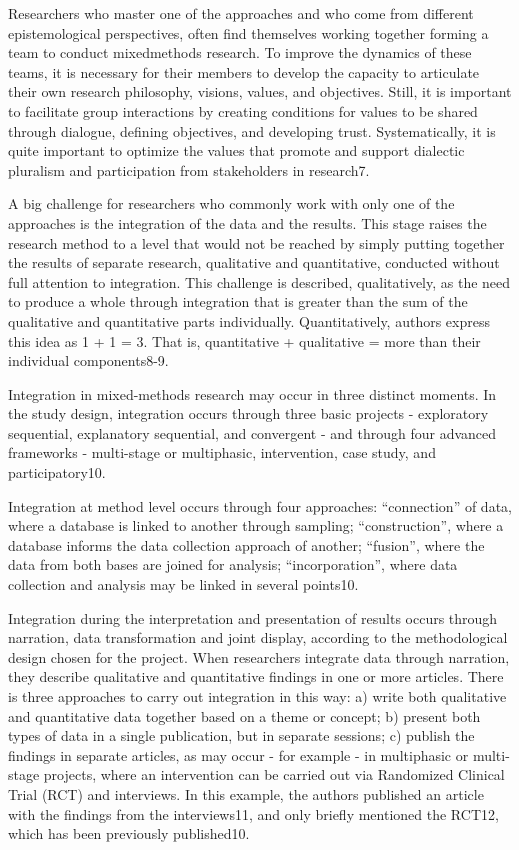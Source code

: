 Researchers who master one of the approaches and who come from different epistemological perspectives, often find themselves working together forming a team to conduct mixedmethods research. To improve the dynamics of these teams, it is necessary for their members to develop the capacity to articulate their own research philosophy, visions, values, and objectives. Still, it is important to facilitate group interactions by creating conditions for values to be shared through dialogue, defining objectives, and developing trust. Systematically, it is quite important to optimize the values that promote and support dialectic pluralism and participation from stakeholders in research7.

A big challenge for researchers who commonly work with only one of the approaches is the integration of the data and the results. This stage raises the research method to a level that would not be reached by simply putting together the results of separate research, qualitative and quantitative, conducted without full attention to integration. This challenge is described, qualitatively, as the need to produce a whole through integration that is greater than the sum of the qualitative and quantitative parts individually. Quantitatively, authors express this idea as 1 + 1 = 3. That is, quantitative + qualitative = more than their individual components8-9.

Integration in mixed-methods research may occur in three distinct moments. In the study design, integration occurs through three basic projects - exploratory sequential, explanatory sequential, and convergent - and through four advanced frameworks - multi-stage or multiphasic, intervention, case study, and participatory10.

Integration at method level occurs through four approaches: “connection” of data, where a database is linked to another through sampling; “construction”, where a database informs the data collection approach of another; “fusion”, where the data from both bases are joined for analysis; “incorporation”, where data collection and analysis may be linked in several points10.

Integration during the interpretation and presentation of results occurs through narration, data transformation and joint display, according  to the methodological design chosen for the project. When researchers integrate data through narration, they describe qualitative and quantitative findings in one or more articles. There is three approaches to carry out integration in this way: a) write both qualitative and quantitative data together based on a theme or concept; b) present both types of data in a single publication, but in separate sessions; c) publish the findings  in separate articles, as may occur - for example - in multiphasic or multi-stage projects, where an intervention can be carried out via Randomized Clinical Trial (RCT) and interviews. In this example, the authors published an article with the findings from the interviews11, and only briefly mentioned the RCT12, which has been previously published10.

